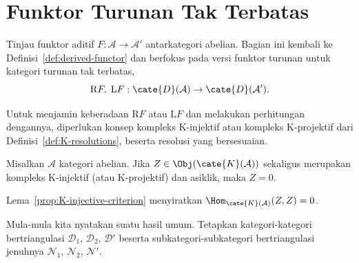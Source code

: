 
\section{Funktor Turunan Tak Terbatas}\label{sec:unbounded-derived}
\hypertarget{o014.aljabr2.chapter4.unbounded-derived-functors}{ }

Tinjau funktor aditif $F:\mathcal{A}\to\mathcal{A}'$ antarkategori abelian.
Bagian ini kembali ke Definisi~\ref{def:derived-functor} dan berfokus pada
versi funktor turunan untuk kategori turunan tak terbatas,
\[ \mathrm{R}F, \; \mathrm{L}F: \cate{D}(\mathcal{A}) \to \cate{D}(\mathcal{A}'). \]

Untuk menjamin keberadaan $\mathrm{R}F$ atau $\mathrm{L}F$ dan melakukan
perhitungan dengannya, diperlukan konsep kompleks K-injektif atau kompleks
K-projektif dari Definisi~\ref{def:K-resolutions}, beserta resolusi
yang bersesuaian.

\begin{lema}\label{prop:K-injective-zero}
	Misalkan $\mathcal{A}$ kategori abelian. Jika
	$Z\in\Obj(\cate{K}(\mathcal{A}))$ sekaligus merupakan kompleks K-injektif
	(atau K-projektif) dan asiklik, maka $Z=0$.
\end{lema}
\begin{bukti}
	Lema~\ref{prop:K-injective-criterion} menyiratkan
	$\Hom_{\cate{K}(\mathcal{A})}(Z,Z)=0$.
\end{bukti}

Mula-mula kita nyatakan suatu hasil umum. Tetapkan kategori-kategori
bertriangulasi $\mathcal{D}_1$, $\mathcal{D}_2$, $\mathcal{D}'$ beserta
subkategori-subkategori bertriangulasi jenuhnya
$\mathcal{N}_1$, $\mathcal{N}_2$, $\mathcal{N}'$.

